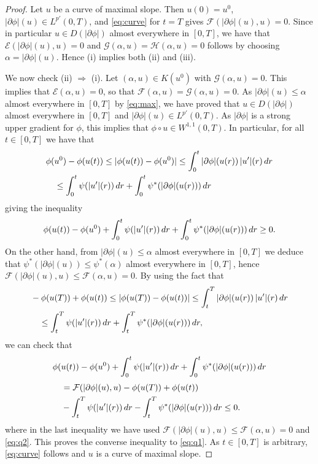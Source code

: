 \documentclass[10pt,a4paper]{amsart}
\newcommand{\dr}{{\rm d} r}
\renewcommand{\sl}{|\partial \phi|}
\newcommand{\GG}{{\mathcal G}}
\newcommand{\EE}{{\mathcal E}}
\newcommand{\FF}{{\mathcal F}}
\newcommand{\HH}{{\mathcal H}}
\begin{document}
\begin{proof}
  Let $u$ be a curve of maximal slope. Then $u(0)=u^0$, $\sl (u) \in
  L^{p'}(0,T)$, and \eqref{eq:curve} for
  $t=T$ gives $\FF(\sl(u),u)=0$. Since in particular $u \in D(\sl) $
  almost everywhere in $[0,T]$, we have that $\EE(\sl(u),u)=0$ and $
  \GG(\alpha,u)  = \HH (\alpha,u)  =0$ follows by choosing
  $\alpha = \sl(u)$.  Hence (i) implies both (ii) and (iii). 

 We now check (ii) $\Rightarrow$ (i). Let    $(\alpha,u)\in K(u^0)$ with  
  $\GG(\alpha,u)=0$. This implies
  that  $\EE(\alpha,u) = 0$, so that $\FF(\alpha,u) =   \GG(\alpha,u)=0$. As $\sl(u) \leq \alpha$ almost everywhere in $[0,T]$  by \eqref{eq:max}, we have proved that $u \in
  D(\sl)$ almost everywhere in $[0,T]$ and  
  $\sl(u)\in L^{p'}(0,T)$. As $\sl$ is a strong upper gradient for
  $\phi$, this implies that $\phi\circ u\in W^{1,1}(0,T)$. In
  particular, for all $t\in [0,T]$ we have that
  \begin{align*}
    &\phi(u^0)-\phi(u(t))\leq |\phi(u(t))-\phi(u^0)| \leq \int_0^t \sl(u(r))\, |u'|(r)\, \dr \\
    &\quad\leq
    \int_0^t\psi( |u'| (r))\, \dr +  \int_0^t\psi^*(\sl  (u(r)))\,
    \dr 
  \end{align*}
 giving the inequality
  \begin{equation} \phi(u(t)) - \phi(u^0) + 
     \int_0^t\psi( |u'| (r))\, \dr +  \int_0^t\psi^*(\sl (u(r)))\,
    \dr \geq 0.\label{eq:q1}
    \end{equation}
 On the other hand, from $\sl(u) \leq \alpha$ almost everywhere in
 $[0,T]$ we deduce that $\psi^*(\sl(u))\leq \psi^*(\alpha)$ almost everywhere in
 $[0,T]$, hence $\FF(\sl(u),u)\leq \FF(\alpha,u)=0$.  By using the fact that 
    \begin{align}
      &-\phi(u(T)) +\phi(u(t)) \leq |\phi(u(T))-\phi(u(t))|\leq
      \int_t^T \sl(u(r))\, |u'|(r)\, \dr \nonumber \\
      &\quad \leq
   \int_t^T\psi( |u'| (r))\, \dr +  \int_t^T\psi^*(\sl  (u(r)))\,
    \dr, \label{eq:q2}
    \end{align}
    we can check that 
  \begin{align*}
    &\phi(u(t))-\phi(u^0) + \int_0^t\psi( |u'| (r))\, \dr +
      \int_0^t\psi^*(\sl  (u(r)))\,
    \dr  \\[1mm]
    &\quad = \FF(\sl (u),u) -\phi(u(T))+\phi(u(t)) \\
    &\quad - \int_t^T\psi( |u'| (r))\, \dr -
      \int_t^T\psi^*(\sl (u(r)))\,
    \dr   \leq 0.
  \end{align*}
  where in the last inequality we have used $\FF(\sl (u),u)\leq \FF(\alpha,u)=0$ and
  \eqref{eq:q2}. This proves the converse inequality to
  \eqref{eq:q1}. As $t \in [0,T]$ is arbitrary,   \eqref{eq:curve}
  follows and $u$ is a curve of maximal slope.


\end{proof}
\end{document}
